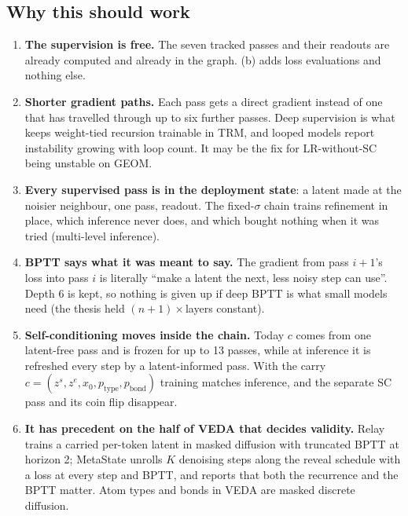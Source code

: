 \documentclass[11pt,a4paper]{article}
\newcommand{\zs}{z^{s}}
\newcommand{\ze}{z^{e}}
\newcommand{\xh}{\hat{x}_0}
\begin{document}
\subsection{Why this should work}

\begin{enumerate}
  \item \textbf{The supervision is free.} The seven tracked passes and their readouts
        are already computed and already in the graph. (b) adds loss evaluations and
        nothing else.
  \item \textbf{Shorter gradient paths.} Each pass gets a direct gradient instead of
        one that has travelled through up to six further passes. Deep supervision is
        what keeps weight-tied recursion trainable in TRM, and looped models report
        instability growing with loop count. It may be the fix for LR-without-SC being
        unstable on GEOM.
  \item \textbf{Every supervised pass is in the deployment state}: a latent made at
        the noisier neighbour, one pass, readout. The fixed-$\sigma$ chain trains
        refinement in place, which inference never does, and which bought nothing when
        it was tried (multi-level inference).
  \item \textbf{BPTT says what it was meant to say.} The gradient from pass $i{+}1$'s
        loss into pass $i$ is literally ``make a latent the next, less noisy step can
        use''. Depth 6 is kept, so nothing is given up if deep BPTT is what small
        models need (the thesis held $(n{+}1)\times$layers constant).
  \item \textbf{Self-conditioning moves inside the chain.} Today $c$ comes from one
        latent-free pass and is frozen for up to 13 passes, while at inference it is
        refreshed every step by a latent-informed pass. With the carry
        $c=(\zs,\ze,\xh,p_{\text{type}},p_{\text{bond}})$ training matches inference,
        and the separate SC pass and its coin flip disappear.
  \item \textbf{It has precedent on the half of VEDA that decides validity.} Relay
        trains a carried per-token latent in masked diffusion with truncated BPTT at
        horizon 2; MetaState unrolls $K$ denoising steps along the reveal schedule with
        a loss at every step and BPTT, and reports that both the recurrence and the
        BPTT matter. Atom types and bonds in VEDA are masked discrete diffusion.
\end{enumerate}
\end{document}
